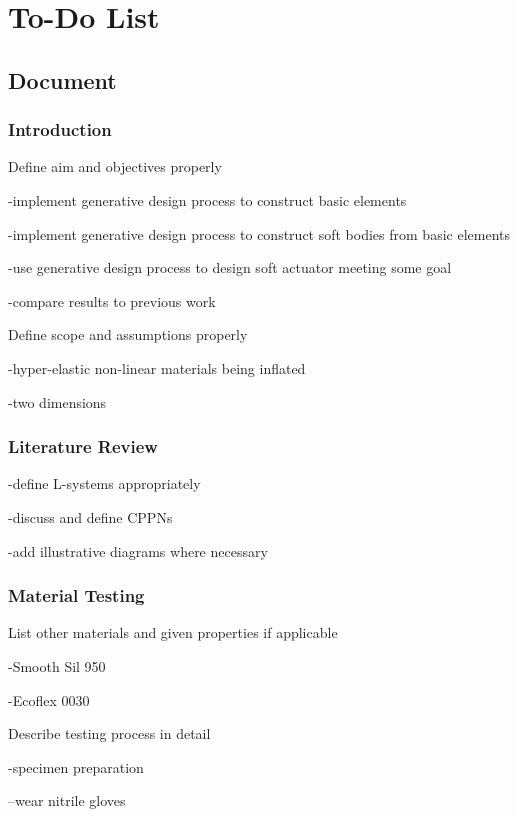 \chapter{To-Do List}
\label{chp:TD}

\section{Document}

\subsection{Introduction}

Define aim and objectives properly

-implement generative design process to construct basic elements

-implement generative design process to construct soft bodies from basic elements

-use generative design process to design soft actuator meeting some goal

-compare results to previous work



Define scope and assumptions properly

-hyper-elastic non-linear materials being inflated

-two dimensions

\subsection{Literature Review}

-define L-systems appropriately

-discuss and define CPPNs

-add illustrative diagrams where necessary

\subsection{Material Testing}

List other materials and given properties if applicable

-Smooth Sil 950

-Ecoflex 0030



Describe testing process in detail

-specimen preparation

	--wear nitrile gloves
	
